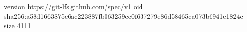 version https://git-lfs.github.com/spec/v1
oid sha256:a58d1663875e6ac223887fb063259ec0f637279e86d58465ca073b6941e1824c
size 4111
